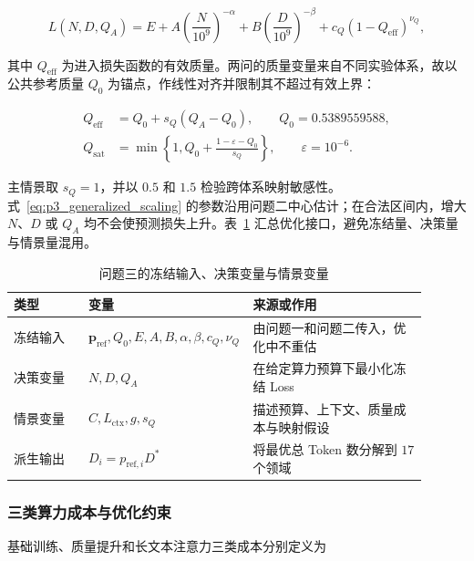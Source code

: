 \begin{equation}
L(N,D,Q_A)
=E+A\left(\frac{N}{10^9}\right)^{-\alpha}
+B\left(\frac{D}{10^9}\right)^{-\beta}
+c_Q(1-Q_{\mathrm{eff}})^{\nu_Q},
\label{eq:p3_generalized_scaling}
\end{equation}

其中 $Q_{\mathrm{eff}}$ 为进入损失函数的有效质量。两问的质量变量来自不同实验体系，故以公共参考质量 $Q_0$ 为锚点，作线性对齐并限制其不超过有效上界：

\begin{equation}
\begin{aligned}
Q_{\mathrm{eff}}&=Q_0+s_Q(Q_A-Q_0),
\qquad Q_0=0.5389559588,\\
Q_{\mathrm{sat}}&=\min\left\{1,
Q_0+\frac{1-\varepsilon-Q_0}{s_Q}\right\},
\qquad \varepsilon=10^{-6}.
\end{aligned}
\label{eq:p3_quality_mapping}
\end{equation}

主情景取 $s_Q=1$，并以 $0.5$ 和 $1.5$ 检验跨体系映射敏感性。式~\eqref{eq:p3_generalized_scaling} 的参数沿用问题二中心估计；在合法区间内，增大 $N$、$D$ 或 $Q_A$ 均不会使预测损失上升。表~\ref{tab:p3_interface} 汇总优化接口，避免冻结量、决策量与情景量混用。

\begin{table}[!htbp]
\centering
\small
\setlength{\tabcolsep}{5pt}
\caption{问题三的冻结输入、决策变量与情景变量}
\label{tab:p3_interface}
\begin{tabular}{p{0.18\linewidth}p{0.30\linewidth}p{0.42\linewidth}}
\toprule
类型 & 变量 & 来源或作用 \\
\midrule
冻结输入 & $\boldsymbol p_{\mathrm{ref}},Q_0,E,A,B,\alpha,\beta,c_Q,\nu_Q$ & 由问题一和问题二传入，优化中不重估 \\
决策变量 & $N,D,Q_A$ & 在给定算力预算下最小化冻结 Loss \\
情景变量 & $C,L_{\mathrm{ctx}},g,s_Q$ & 描述预算、上下文、质量成本与映射假设 \\
派生输出 & $D_i=p_{\mathrm{ref},i}D^*$ & 将最优总 Token 数分解到 $17$ 个领域 \\
\bottomrule
\end{tabular}
\end{table}

\subsubsection{三类算力成本与优化约束}

基础训练、质量提升和长文本注意力三类成本分别定义为

